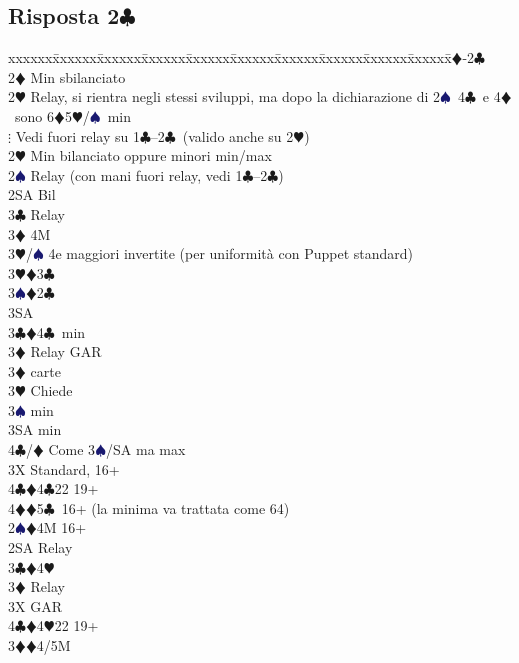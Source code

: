 \documentclass[a4paper,italian]{article}
\newcommand{\BC}{\textcolor{OliveGreen}{$\clubsuit$}}
\newcommand{\BD}{\textcolor{RedOrange}{$\vardiamondsuit$}}
\newcommand{\BH}{\textcolor{Red2}{$\varheartsuit${}}}
\newcommand{\BS}{\textcolor{MidnightBlue}{$\spadesuit${}}}
\newcommand{\pdfc}{\texorpdfstring{\BC{}}{C}}
\newenvironment{bidtable}
{\begin{tabbing}

    xxxxxx\=xxxxxx\=xxxxxx\=xxxxxx\=xxxxxx\=xxxxxx\=xxxxxx\=xxxxxx\=xxxxxx\=xxxxxx\=\kill}
{\end{tabbing} }%
\begin{document}
\newpage

\subsection{Risposta 2\pdfc}

\begin{bidtable}
    1\BD-2\BC\+\\
    2\BD \> Min sbilanciato\+\\
    2\BH \> Relay, si rientra negli stessi sviluppi, ma dopo la dichiarazione di 2\BS\ 4\BC\ e 4\BD\ sono 6\BD 5\BH /\BS\ min\\
    \large{$\vdots$} \> Vedi fuori relay su 1\BC--2\BC\ (valido anche su 2\BH)\-\\[2pt]
    2\BH \> Min bilanciato oppure minori min/max\+\\
    2\BS \> Relay (con mani fuori relay, vedi 1\BC--2\BC)\+\\
    2\small{SA} \> Bil\+\\
    3\BC \> Relay\+\\
    3\BD \> 4M\+\\
    3\BH/\BS \> 4e maggiori invertite (per uniformità con Puppet standard)\-\\
    3\BH {}\BD 3\BC \\
    3\BS {}\BD 2\BC \\
    3\small{SA} \-\-\\
    3\BC {}\BD 4\BC\ min\+\\
    3\BD \> Relay GAR\-\\
    3\BD {} carte\+\\
    3\BH \> Chiede\+\\
    3\BS {} min\\
    3\small{SA}  min\\
    4\BC/\BD \> Come 3\BS /SA ma max\-\-\\
    3X \> Standard, 16+\\
    4\BC {}\BD 4\BC 22 19+\\
    4\BD {}\BD 5\BC\ 16+ (la minima va trattata come 64)\-\-\\
    2\BS {}\BD 4M 16+\+\\
    2\small{SA} \> Relay\+\\
    3\BC {}\BD 4\BH \+\\
    3\BD \> Relay\+\\
    3X \> GAR\\
    4\BC {}\BD 4\BH 22 19+\-\-\\
    3\BD {}\BD 4/5M\+\\

\end{bidtable}
\end{document}
